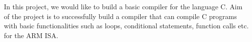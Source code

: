 In this project, we would like to build a basic compiler for the 
language C. Aim of the project is to successfully build a compiler 
that can compile C programs with basic functionalities such as loops, 
conditional statements, function calls etc. for the ARM ISA\cite{ARM}.